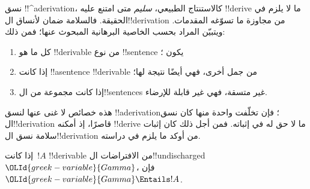 \documentclass[../../../include/open-logic-section]{subfiles}
\begin{document}
      {}
      {}
      

\begin{explain}
نسق !!^a{derivation}، كالاستنتاج الطبيعي، \emph{سليم} متى امتنع عليه
!!{derive} ما لا يلزم في الحقيقة. فالسلامة ضمان لأنساق ال!!{derivation}
من مجاوزة ما تسوّغه المقدمات. ويتبيّن المراد بحسب الخاصية البرهانية
المبحوث عنها؛ فمن ذلك:
\begin{enumerate}
\item كل ما هو !!{derivable} من نوع !!{sentence} يكون ؛
\item إذا كانت !!a{sentence} !!{derivable} من جمل أخرى، فهي أيضًا
  نتيجة لها؛
\item إذا كانت مجموعة من ال!!{sentence}s غير متسقة، فهي غير قابلة
  للإرضاء.
\end{enumerate}
هذه خصائص لا غنى عنها لنسق !!a{derivation}؛ فإن تخلّفت واحدة منها
كان نسق ال!!{derivation} قاصرًا، إذ أمكنه !!{derive} ما لا حق له في
إثباته. فمن أجل ذلك كان إثبات سلامة نسق ال!!{derivation} من أوكد
ما يلزم في دراسته.
\end{explain}

\begin{thm}[السلامة]
إذا كانت~$!A$ !!{derivable} من الافتراضات ال!!{undischarged}
$\OLId{greek-variable}{Gamma}$، فإن~$\OLId{greek-variable}{Gamma} \Entails !A$.
\end{thm}
\end{document}
